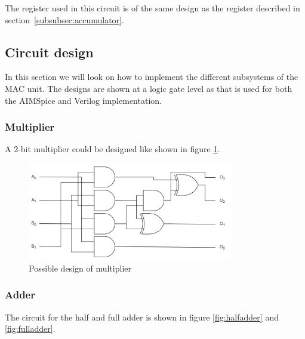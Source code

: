 The register used in this circuit is of the same design as the register described in section~\ref{subsubsec:accumulator}.


\subsection{Circuit design}
\label{subsec:circuitDesign}

In this section we will look on how to implement the different subsystems of the MAC unit. The designs are shown at a logic gate level as that is used for both the AIMSpice and Verilog implementation. 

\subsubsection{Multiplier} 

A 2-bit multiplier could be designed like shown in figure \ref{fig:multiplier}.

\begin{figure}[H]
    \centering
    \includegraphics[width=0.8\textwidth]{Figures/multiplier.png}
    \caption{Possible design of multiplier}
    \label{fig:multiplier}
\end{figure}

\subsubsection{Adder}
The circuit for the half and full adder is shown in figure \ref{fig:halfadder} and \ref{fig:fulladder}.

